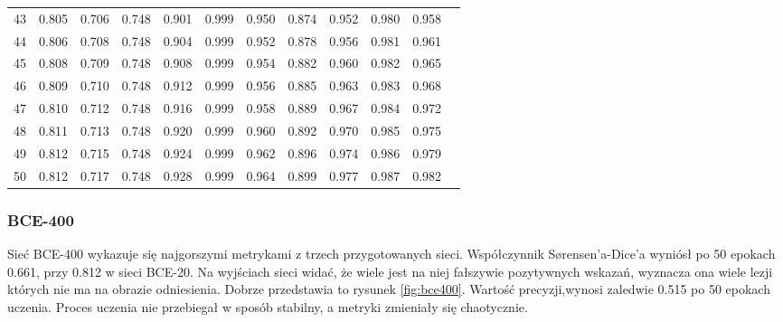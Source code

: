 \begin{longtable}[p]{|c|c|c|c|c|c|c|c|c|c|c|c|}
	43 & 0.805 & 0.706 & 0.748 & 0.901 & 0.999 & 0.950 & 0.874 & 0.952 & 0.980 & 0.958 \\
	44 & 0.806 & 0.708 & 0.748 & 0.904 & 0.999 & 0.952 & 0.878 & 0.956 & 0.981 & 0.961 \\
	45 & 0.808 & 0.709 & 0.748 & 0.908 & 0.999 & 0.954 & 0.882 & 0.960 & 0.982 & 0.965 \\
	46 & 0.809 & 0.710 & 0.748 & 0.912 & 0.999 & 0.956 & 0.885 & 0.963 & 0.983 & 0.968 \\
	47 & 0.810 & 0.712 & 0.748 & 0.916 & 0.999 & 0.958 & 0.889 & 0.967 & 0.984 & 0.972 \\
	48 & 0.811 & 0.713 & 0.748 & 0.920 & 0.999 & 0.960 & 0.892 & 0.970 & 0.985 & 0.975 \\
	49 & 0.812 & 0.715 & 0.748 & 0.924 & 0.999 & 0.962 & 0.896 & 0.974 & 0.986 & 0.979 \\
	50 & 0.812 & 0.717 & 0.748 & 0.928 & 0.999 & 0.964 & 0.899 & 0.977 & 0.987 & 0.982 
	\label{tab:metrics-bce20}
\end{longtable}
\subsubsection{BCE-400}
\par
Sieć BCE-400 wykazuje się najgorszymi metrykami z trzech przygotowanych sieci. Współczynnik Sørensen'a-Dice'a wyniósł po 50 epokach 0.661, przy 0.812 w sieci BCE-20. Na wyjściach sieci widać, że wiele jest na niej fałszywie pozytywnych wskazań, wyznacza ona wiele lezji których nie ma na obrazie odniesienia. Dobrze przedstawia to rysunek \ref{fig:bce400}. Wartość precyzji,wynosi zaledwie 0.515 po 50 epokach uczenia. Proces uczenia nie przebiegał w sposób stabilny, a metryki zmieniały się chaotycznie.


